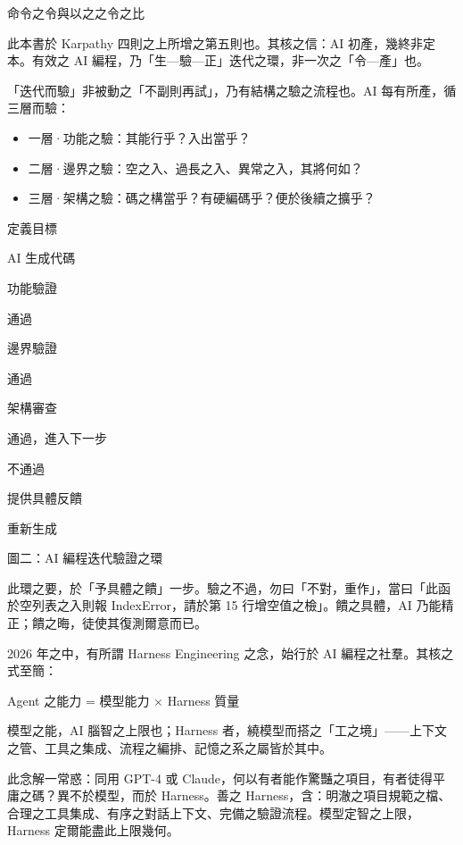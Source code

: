 \begin{center}\small\color{gray}命令之令與以之之令之比\end{center}


此本書於 Karpathy 四則之上所增之第五則也。其核之信：AI 初產，幾終非定本。有效之 AI 編程，乃「生—驗—正」迭代之環，非一次之「令—產」也。

「迭代而驗」非被動之「不副則再試」，乃有結構之驗之流程也。AI 每有所產，循三層而驗：

\begin{itemize}
  \item 一層·功能之驗：其能行乎？入出當乎？
  \item 二層·邊界之驗：空之入、過長之入、異常之入，其將何如？
  \item 三層·架構之驗：碼之構當乎？有硬編碼乎？便於後續之擴乎？
\end{itemize}

定義目標

AI 生成代碼

功能驗證

通過

邊界驗證

通過

架構審查

通過，進入下一步

不通過

提供具體反饋

重新生成

\begin{center}\small\color{gray}圖二：AI 編程迭代驗證之環\end{center}

此環之要，於「予具體之饋」一步。驗之不過，勿曰「不對，重作」，當曰「此函於空列表之入則報 IndexError，請於第 15 行增空值之檢」。饋之具體，AI 乃能精正；饋之晦，徒使其復測爾意而已。


2026 年之中，有所謂 Harness Engineering 之念，始行於 AI 編程之社羣。其核之式至簡：

Agent 之能力 = 模型能力 × Harness 質量

模型之能，AI 腦智之上限也；Harness 者，繞模型而搭之「工之境」——上下文之管、工具之集成、流程之編排、記憶之系之屬皆於其中。

此念解一常惑：同用 GPT-4 或 Claude，何以有者能作驚豔之項目，有者徒得平庸之碼？異不於模型，而於 Harness。善之 Harness，含：明澈之項目規範之檔、合理之工具集成、有序之對話上下文、完備之驗證流程。模型定智之上限，Harness 定爾能盡此上限幾何。

